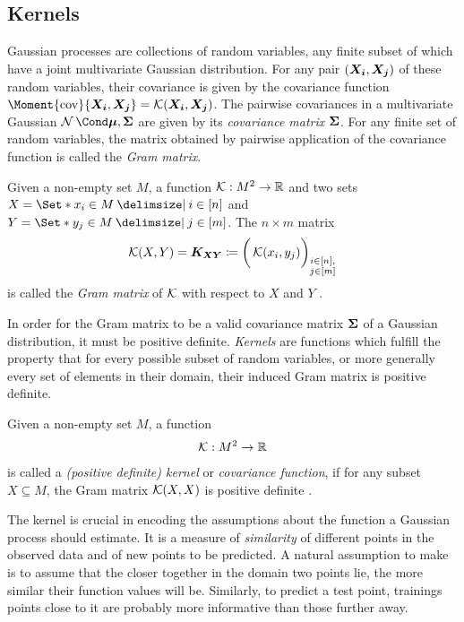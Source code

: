 \subsection{Kernels}
Gaussian processes are collections of random variables, any finite subset of which have a joint multivariate Gaussian distribution.
For any pair $(\bm{X_i}, \bm{X_j})$ of these random variables, their covariance is given by the covariance function $\Moment{\cov}{\rv{X_i}, \rv{X_j}} = \K(\rv{X_i}, \rv{X_j})$.
The pairwise covariances in a multivariate Gaussian $\Gaussian{\mat{\mu}, \mat{\Sigma}}$ are given by its \emph{covariance matrix} $\bm{\Sigma}$.
For any finite set of random variables, the matrix obtained by pairwise application of the covariance function is called the \emph{Gram matrix}.
\begin{definition}
    Given a non-empty set $M$, a function $\operatorname{\mathcal{K}} : M^2 \to \mathbb{R}$ and two sets $X = \Set*{x_i \in M \with i \in [n]}$ and $Y = \Set*{y_j \in M \with j \in [m]}$.
    The $n \times m$ matrix
    \begin{align}
        \operatorname{\mathcal{K}}(X, Y) = \bm{K_{XY}} \coloneqq \bigg( \operatorname{\mathcal{K}}(x_i, y_j) \bigg)_{\substack{i \in [n], \\ j \in [m]}}
    \end{align}
    is called the \emph{Gram matrix} of $\operatorname{\mathcal{K}}$ with respect to $X$ and $Y$ \cite{scholkopf_learning_2002}.
\end{definition}
In order for the Gram matrix to be a valid covariance matrix $\bm{\Sigma}$ of a Gaussian distribution, it must be positive definite.
\emph{Kernels} are functions which fulfill the property that for every possible subset of random variables, or more generally every set of elements in their domain, their induced Gram matrix is positive definite.
\begin{definition}[Kernel]
    Given a non-empty set $M$, a function
    \begin{align}
        \operatorname{\mathcal{K}} : M^2 \to \mathbb{R}
    \end{align}
    is called a \emph{(positive definite) kernel} or \emph{covariance function}, if for any subset $X \subseteq M$, the Gram matrix $\operatorname{\mathcal{K}}(X, X)$ is positive definite \cite{scholkopf_learning_2002}.
\end{definition}
The kernel is crucial in encoding the assumptions about the function a Gaussian process should estimate.
It is a measure of \emph{similarity} of different points in the observed data and of new points to be predicted.
A natural assumption to make is to assume that the closer together in the domain two points lie, the more similar their function values will be.
Similarly, to predict a test point, trainings points close to it are probably more informative than those further away.

